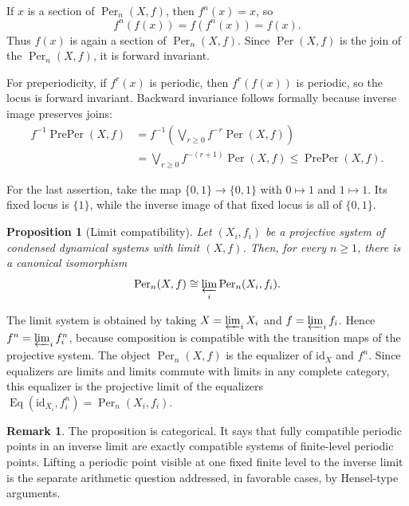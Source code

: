 \documentclass[10pt]{amsart}
\makeatletter
\newcommand{\Eq}{\operatorname{Eq}}
\newcommand{\Per}{\operatorname{Per}}
\newcommand{\PrePer}{\operatorname{PrePer}}
\theoremstyle{plain}
\newtheorem{proposition}[theorem]{Proposition}
\theoremstyle{definition}
\newtheorem{remark}[theorem]{Remark}
\renewenvironment{proof}[1][\proofname]{\par
  \pushQED{\qed}%
  \normalfont \topsep6\p@\@plus6\p@\relax
  \trivlist
  \item[\hskip\labelsep\itshape #1\@addpunct{:}]\ignorespaces
}{%
  \popQED\endtrivlist\@endpefalse
}
\makeatother
\begin{document}
\begin{proof}
If $x$ is a section of $\Per_n(X,f)$, then $f^n(x)=x$, so
\[
  f^n(f(x))=f(f^n(x))=f(x).
\]
Thus $f(x)$ is again a section of $\Per_n(X,f)$. Since $\Per(X,f)$ is the join
of the $\Per_n(X,f)$, it is forward invariant.

For preperiodicity, if $f^r(x)$ is periodic, then $f^r(f(x))$ is periodic, so
the locus is forward invariant. Backward invariance follows formally because
inverse image preserves joins:
\begin{align*}
  f^{-1}\PrePer(X,f)
  &=
  f^{-1}\left(\bigvee_{r\ge0}f^{-r}\Per(X,f)\right)
\\
  &=
  \bigvee_{r\ge0}f^{-(r+1)}\Per(X,f)
  \le
  \PrePer(X,f).
\end{align*}
\end{proof}

For the last assertion, take the map $\{0,1\}\to\{0,1\}$ with $0\mapsto1$ and
$1\mapsto1$. Its fixed locus is $\{1\}$, while the inverse image of that fixed
locus is all of $\{0,1\}$.

\begin{proposition}[Limit compatibility]
\label{prop:limit}
Let $(X_i,f_i)$ be a projective system of condensed dynamical systems with
limit $(X,f)$. Then, for every $n\ge1$, there is a canonical isomorphism
\[
  \Per_n(X,f)\cong\varprojlim_i\Per_n(X_i,f_i).
\]
\end{proposition}

\begin{proof}
The limit system is obtained by taking $X=\varprojlim_i X_i$ and
$f=\varprojlim_i f_i$. Hence $f^n=\varprojlim_i f_i^n$, because composition is
compatible with the transition maps of the projective system. The object
$\Per_n(X,f)$ is the equalizer of $\mathrm{id}_X$ and $f^n$. Since equalizers are
limits and limits commute with limits in any complete category, this equalizer is
the projective limit of the equalizers
$\Eq(\mathrm{id}_{X_i},f_i^n)=\Per_n(X_i,f_i)$.
\end{proof}

\begin{remark}
The proposition is categorical. It says that fully compatible periodic points
in an inverse limit are exactly compatible systems of finite-level periodic
points. Lifting a periodic point visible at one fixed finite level to the
inverse limit is the separate arithmetic question addressed, in favorable
cases, by Hensel-type arguments.
\end{remark}
\end{document}
